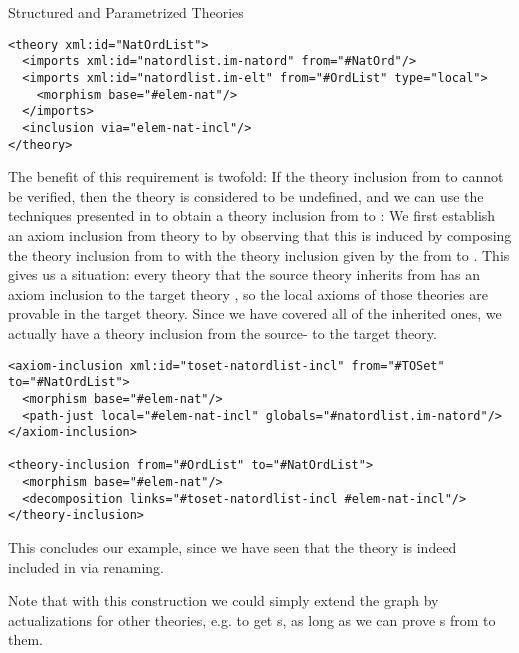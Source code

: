 \begin{omgroup}[id=natlist]{Structured and Parametrized Theories}
\begin{lstlisting}[mathescape,label=lst:nat-list,
  index={theory,imports,morphism,inclusion}]
<theory xml:id="NatOrdList">
  <imports xml:id="natordlist.im-natord" from="#NatOrd"/>
  <imports xml:id="natordlist.im-elt" from="#OrdList" type="local">
    <morphism base="#elem-nat"/>
  </imports>
  <inclusion via="elem-nat-incl"/>
</theory>
\end{lstlisting}
The benefit of this {} requirement is twofold: If the theory inclusion
from {} to {} cannot be verified, then the theory
{} is considered to be undefined, and we can use the
{} techniques presented in {} to
obtain a theory inclusion from {} to {}: We first
establish an axiom inclusion from theory {} to {} by
observing that this is induced by composing the theory inclusion from {} to
{} with the theory inclusion given by the {} from
{} to {}. This gives us a
{} situation: every theory that the source theory {}
inherits from has an axiom inclusion to the target theory {}, so the
local axioms of those theories are provable in the target theory. Since we have covered
all of the inherited ones, we actually have a theory inclusion from the source- to the
target theory.

\begin{lstlisting}[mathescape,label=lst:nat-list-inclusions,
  index={theory,imports,morphism,inclusion}]
<axiom-inclusion xml:id="toset-natordlist-incl" from="#TOSet" to="#NatOrdList">
  <morphism base="#elem-nat"/>
  <path-just local="#elem-nat-incl" globals="#natordlist.im-natord"/>
</axiom-inclusion>

<theory-inclusion from="#OrdList" to="#NatOrdList">
  <morphism base="#elem-nat"/>
  <decomposition links="#toset-natordlist-incl #elem-nat-incl"/>
</theory-inclusion>
\end{lstlisting}

This concludes our example, since we have seen that the theory {} is
indeed included in {} via renaming.

Note that with this construction we could simply extend the graph by actualizations for
other theories, e.g. to get {s}, as long as we can prove
{s} from {} to them.
\end{omgroup}

